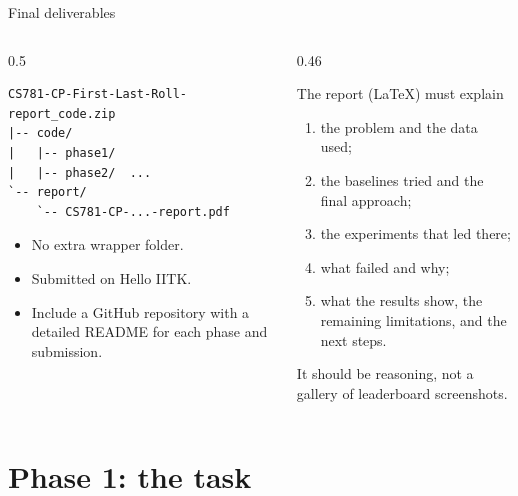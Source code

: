 \documentclass[aspectratio=169,11pt]{beamer}
\begin{document}
\begin{frame}[fragile]{Final deliverables}
  \begin{columns}[T]
    \begin{column}{0.5\textwidth}
      \small
\begin{verbatim}
CS781-CP-First-Last-Roll-report_code.zip
|-- code/
|   |-- phase1/
|   |-- phase2/  ...
`-- report/
    `-- CS781-CP-...-report.pdf
\end{verbatim}
      \vspace{-2mm}
      \begin{itemize}
        \item No extra wrapper folder.
        \item Submitted on Hello IITK.
        \item Include a GitHub repository with a detailed README for each phase and submission.
      \end{itemize}
    \end{column}
    \begin{column}{0.46\textwidth}
      \begin{block}{The report (LaTeX) must explain}
        \small
        \begin{enumerate}
          \item the problem and the data used;
          \item the baselines tried and the final approach;
          \item the experiments that led there;
          \item what failed and why;
          \item what the results show, the remaining limitations, and the next steps.
        \end{enumerate}
        It should be reasoning, not a gallery of leaderboard screenshots.
      \end{block}
    \end{column}
  \end{columns}
\end{frame}

\section{Phase 1: the task}
\end{document}

